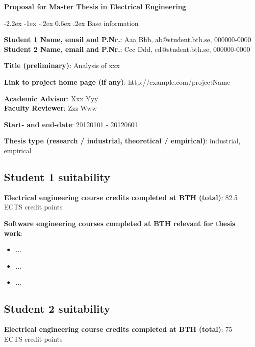 \documentclass[10pt,english,a4paper]{article}
\makeatletter
\newcommand{\emptyLine}{
	\vspace{16pt}
}
\newcommand{\bthProposalTitle}[1]{
	\noindent\textbf{\Large{#1}}
}
\renewcommand\section{
	\@startsection {section}{1}{\z@}%
		{-2.2ex \@plus -1ex \@minus -.2ex}%
		{0.6ex \@plus.2ex}%
		{\itshape\large\bfseries}
}
\makeatother
\begin{document}


\bthProposalTitle{Proposal for Master Thesis in Electrical Engineering}


\section{{Base information}}

\noindent
\textbf{Student 1 Name, email and P.Nr.}: Aaa Bbb, ab@student.bth.se, 000000-0000 \\
\textbf{Student 2 Name, email and P.Nr.}: Ccc Ddd, cd@student.bth.se, 000000-0000  
\emptyLine{}

\noindent\textbf{Title (preliminary)}: Analysis of xxx
\emptyLine{}

\noindent\textbf{Link to project home page (if any)}: http://example.com/projectName
\emptyLine{}

\noindent
\textbf{Academic Advisor}: Xxx Yyy \\
\textbf{Faculty Reviewer}:  Zzz Www
\emptyLine{}

\noindent\textbf{Start- and end-date}: 20120101 - 20120601
\emptyLine{}

\noindent\textbf{Thesis type (research / industrial, theoretical / empirical)}: industrial, empirical
\emptyLine{}

\subsection*{Student 1 suitability}
\noindent\textbf{Electrical engineering course credits completed at BTH (total)}: 82.5 ECTS credit points
\emptyLine{}

\noindent\textbf{Software engineering courses completed at BTH relevant for thesis work}:
\begin{itemize}
\item{...}
\item{...}
\item{...}
\end{itemize}


\subsection*{Student 2 suitability}
\noindent\textbf{Electrical engineering course credits completed at BTH (total)}: 75 ECTS credit points
\emptyLine{}
\end{document}
